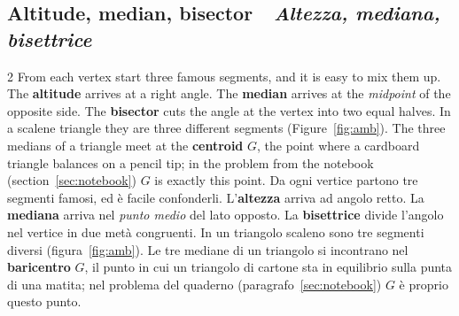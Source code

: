 \documentclass[10pt,a4paper,oneside]{book}
\newif\ifIT
\newenvironment{bi}%
  {\begin{paracol}{2}\global\ITfalse\selectlanguage{english}}%
  {\end{paracol}}
\newcommand{\IT}{\switchcolumn\global\ITtrue\selectlanguage{italian}}
\newcommand{\bisubsection}[2]{%
  \Needspace{6\baselineskip}%
  \subsection[#1 \textperiodcentered\ #2]{#1 {\color{itgreen}\itshape\,\textperiodcentered\ #2}}}
\begin{document}
\bisubsection{Altitude, median, bisector}{Altezza, mediana, bisettrice}
\begin{bi}
From each vertex start three famous segments, and it is easy to mix them up. The \textbf{altitude} arrives at a right angle. The \textbf{median} arrives at the \emph{midpoint} of the opposite side. The \textbf{bisector} cuts the angle at the vertex into two equal halves. In a scalene triangle they are three different segments (Figure~\ref{fig:amb}). The three medians of a triangle meet at the \textbf{centroid} $G$, the point where a cardboard triangle balances on a pencil tip; in the problem from the notebook (section~\ref{sec:notebook}) $G$ is exactly this point.
\IT
Da ogni vertice partono tre segmenti famosi, ed è facile confonderli. L'\textbf{altezza} arriva ad angolo retto. La \textbf{mediana} arriva nel \emph{punto medio} del lato opposto. La \textbf{bisettrice} divide l'angolo nel vertice in due metà congruenti. In un triangolo scaleno sono tre segmenti diversi (figura~\ref{fig:amb}). Le tre mediane di un triangolo si incontrano nel \textbf{baricentro} $G$, il punto in cui un triangolo di cartone sta in equilibrio sulla punta di una matita; nel problema del quaderno (paragrafo~\ref{sec:notebook}) $G$ è proprio questo punto.
\end{bi}
\end{document}

